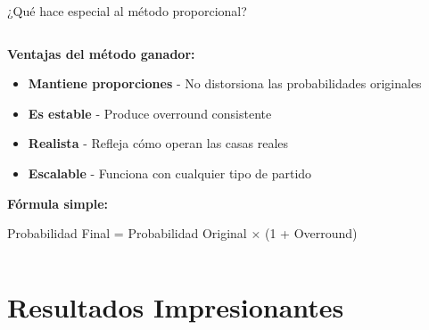 \documentclass[aspectratio=169]{beamer}
\begin{document}
\begin{frame}{¿Qué hace especial al método proporcional?}
\begin{columns}
\begin{column}{0.6\textwidth}
\textbf{Ventajas del método ganador:}
\begin{itemize}
\item \textcolor{verdepositivo}{\textbf{Mantiene proporciones}} - No distorsiona las probabilidades originales
\item \textcolor{azulprincipai}{\textbf{Es estable}} - Produce overround consistente
\item \textcolor{rojocomplementario}{\textbf{Realista}} - Refleja cómo operan las casas reales
\item \textcolor{verdepositivo}{\textbf{Escalable}} - Funciona con cualquier tipo de partido
\end{itemize}

\vspace{0.5cm}
\textbf{Fórmula simple:}
\begin{center}
\large
\colorbox{azulprincipai!20}{Probabilidad Final = Probabilidad Original × (1 + Overround)}
\end{center}
\end{column}
\begin{column}{0.4\textwidth}
\end{column}
\end{columns}
\end{frame}

\section{Resultados Impresionantes}
\end{document}
